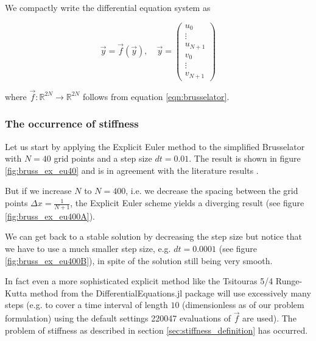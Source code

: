 We compactly write the differential equation system as

\[
  \vec{y} = \vec{f} \left( \vec{y} \right), \quad \vec{y} = \left( \begin{array}{c} u_0 \\ \vdots \\ u_{N+1} \\ v_0 \\ \vdots \\ v_{N+1} \end{array} \right)
\]

where $\vec{f}: \mathbb{R}^{2N} \rightarrow \mathbb{R}^{2N}$ follows from equation \ref*{eqn:brusselator}.

\subsubsection*{The occurrence of stiffness}
Let us start by applying the Explicit Euler method to the simplified Brusselator with $N = 40$ grid points and a step size $dt = 0.01$. The result is shown in figure \ref{fig:bruss_ex_eu40} and is in agreement with the literature results \citep[chapter IV.1]{Hairer1996}.

But if we increase $N$ to $N = 400$, i.e. we decrease the spacing between the grid points $\Delta x = \frac{1}{N+1}$, the Explicit Euler scheme yields a diverging result (see figure \ref{fig:bruss_ex_eu400A}).

We can get back to a stable solution by decreasing the step size but notice that we have to use a much smaller step size, e.g. $dt = 0.0001$ (see figure \ref{fig:bruss_ex_eu400B}), in spite of the solution still being very smooth.

In fact even a more sophisticated explicit method like the Tsitouras 5/4 Runge-Kutta method from the DifferentialEquations.jl package \citep{rackauckas17} will use excessively many steps (e.g. to cover a time interval of length $10$ (dimensionless as of our problem formulation) using the default settings 220047 evaluations of $\vec{f}$ are used). The problem of stiffness as described in section \ref*{sec:stiffness_definition} has occurred.

